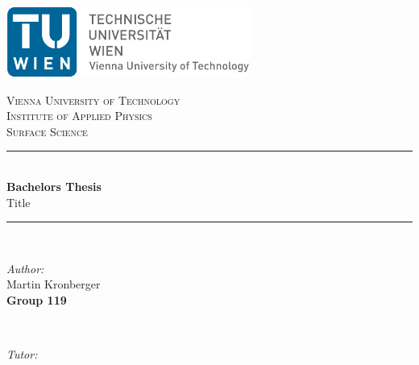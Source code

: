 \thispagestyle{empty}

\newcommand{\HRule}{\rule{\linewidth}{0.5mm}} %

\includegraphics[width=8cm]{figures/logo_en.jpg}
\vspace{3cm}

\begin{center} %

\textsc{\LARGE Vienna University of Technology}\\[1cm] 
\textsc{\Large Institute of Applied Physics}\\[1cm]
\textsc{\large Surface Science}\\[3cm]

\HRule \\[0.4cm]
{\Huge \bfseries Bachelors Thesis}\\[0.5cm] %
{\Large Title}
\HRule \\[2cm]


\begin{minipage}{0.4\textwidth}
\begin{flushleft} \large
	\emph{Author:}\\
	Martin Kronberger\\
    \textbf{Group 119}
	\end{flushleft}
	\end{minipage}
~
\begin{minipage}{0.5\textwidth}
\begin{flushright} \large
	\emph{Tutor:} \\
\end{flushright}
\end{minipage}\
\vspace{1cm}
\makeatletter
\vspace{1cm}
{\large \@date}
\end{center}